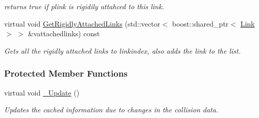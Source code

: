 \begin{DoxyCompactItemize}
\begin{DoxyCompactList}\small\item\em returns true if plink is rigidily attahced to this link. \item\end{DoxyCompactList}\item 
virtual void \hyperlink{classOpenRAVE_1_1KinBody_1_1Link_a1452271a9a62d59785c04764543f94d7}{GetRigidlyAttachedLinks} (std::vector$<$ boost::shared\_\-ptr$<$ \hyperlink{classOpenRAVE_1_1KinBody_1_1Link}{Link} $>$ $>$ \&vattachedlinks) const 
\begin{DoxyCompactList}\small\item\em Gets all the rigidly attached links to linkindex, also adds the link to the list. \item\end{DoxyCompactList}\end{DoxyCompactItemize}
\subsubsection*{Protected Member Functions}
\begin{DoxyCompactItemize}
\item 
\hypertarget{classOpenRAVE_1_1KinBody_1_1Link_a1bab50e6e76ae9ea147557c8126fc59c}{
virtual void \hyperlink{classOpenRAVE_1_1KinBody_1_1Link_a1bab50e6e76ae9ea147557c8126fc59c}{\_\-Update} ()}
\label{classOpenRAVE_1_1KinBody_1_1Link_a1bab50e6e76ae9ea147557c8126fc59c}

\begin{DoxyCompactList}\small\item\em Updates the cached information due to changes in the collision data. \item\end{DoxyCompactList}\end{DoxyCompactItemize}
